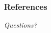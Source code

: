 \documentclass{beamer}
\begin{document}
  \begin{frame}[allowframebreaks]
    \frametitle{References}
    
    
  \end{frame}

  \begin{frame}
    \centering \Huge
    \emph{Questions?}
  \end{frame}  
  
\end{document}
